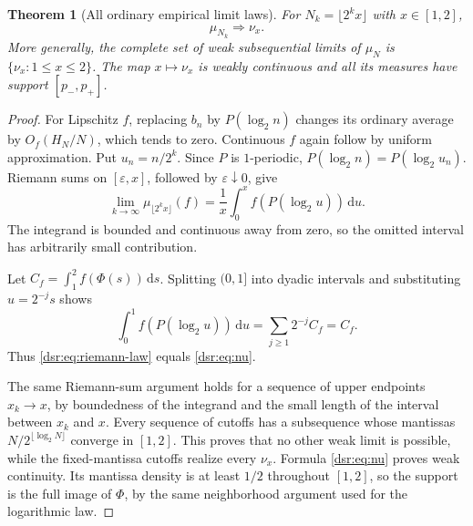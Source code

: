 \documentclass[11pt,a4paper]{article}
\numberwithin{equation}{section}
\newtheorem{theorem}{Theorem}[section]
\theoremstyle{definition}
\theoremstyle{remark}
\newcommand{\dd}{\,\mathrm d}
\theoremstyle{definition}
\theoremstyle{plain}
\begin{document}
\begin{theorem}[All ordinary empirical limit laws]
\label{dsr:thm:ordinary}
For $N_k=\lfloor2^kx\rfloor$ with $x\in[1,2]$,
\begin{equation}
 \mu_{N_k}\Longrightarrow\nu_x.
\end{equation}
More generally, the complete set of weak subsequential limits of $\mu_N$ is
$\{\nu_x:1\le x\le2\}$. The map $x\mapsto\nu_x$ is weakly continuous and
all its measures have support $[p_-,p_+]$.
\end{theorem}
\begin{proof}
For Lipschitz $f$, replacing $b_n$ by $P(\log_2n)$ changes its ordinary
average by $O_f(H_N/N)$, which tends to zero. Continuous $f$ again follow by
uniform approximation. Put $u_n=n/2^k$. Since $P$ is $1$-periodic,
$P(\log_2n)=P(\log_2u_n)$. Riemann sums on $[\varepsilon,x]$, followed by
$\varepsilon\downarrow0$, give
\begin{equation}
 \lim_{k\to\infty}\mu_{\lfloor2^kx\rfloor}(f)
   =\frac1x\int_0^x f(P(\log_2u))\dd u.
\label{dsr:eq:riemann-law}
\end{equation}
The integrand is bounded and continuous away from zero, so the omitted
interval has arbitrarily small contribution.

Let $C_f=\int_1^2f(\Phi(s))\dd s$. Splitting $(0,1]$ into dyadic intervals
and substituting $u=2^{-j}s$ shows
\begin{equation}
 \int_0^1f(P(\log_2u))\dd u
   =\sum_{j\ge1}2^{-j}C_f=C_f.
\end{equation}
Thus \eqref{dsr:eq:riemann-law} equals \eqref{dsr:eq:nu}.

The same Riemann-sum argument holds for a sequence of upper endpoints
$x_k\to x$, by boundedness of the integrand and the small length of the
interval between $x_k$ and $x$. Every sequence of cutoffs has a subsequence
whose mantissas $N/2^{\lfloor\log_2N\rfloor}$ converge in $[1,2]$.
This proves that no other weak limit is possible, while the fixed-mantissa
cutoffs realize every $\nu_x$. Formula \eqref{dsr:eq:nu} proves weak continuity.
Its mantissa density is at least $1/2$ throughout $[1,2]$, so the support is
the full image of $\Phi$, by the same neighborhood argument used for the
logarithmic law.
\end{proof}
\end{document}
